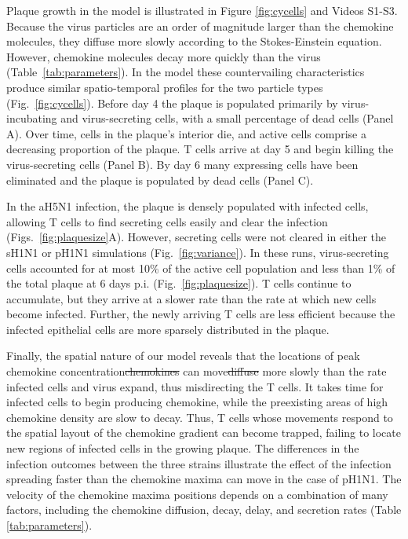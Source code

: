 \documentclass[preprint,10pt,numbers]{elsarticle}
\newcommand{\removed}[1]{{\color{dkred}\sout{#1}}}
\newcommand{\new}[1]{{\color{dkgreen}#1}}
\begin{document}
Plaque growth in the model is illustrated in Figure \ref{fig:cycells} and Videos S1-S3.  Because the virus particles are an order of magnitude larger than the chemokine molecules, they diffuse more slowly according to the Stokes-Einstein equation.  However, chemokine molecules decay more quickly than the virus (Table~\ref{tab:parameters}).  In the model these countervailing characteristics produce similar spatio-temporal profiles for the two particle types (Fig.~\ref{fig:cycells}). Before day 4 the plaque is populated primarily by virus-incubating and virus-secreting cells, with a small percentage of dead cells (Panel A). Over time, cells in the plaque's interior die, and active cells comprise a decreasing proportion of the plaque. T cells arrive at day 5 and begin killing the virus-secreting cells (Panel B). By day 6 many expressing cells have been eliminated and the plaque is populated by dead cells (Panel C).  

In the aH5N1 infection, the plaque is densely populated with infected cells, allowing T cells to find secreting cells easily and clear the infection (Figs.~\ref{fig:plaquesize}A).  However, secreting cells were not cleared in either the sH1N1 or pH1N1 simulations (Fig.~\ref{fig:variance}).  In these runs, virus-secreting cells accounted for at most 10\% of the active cell population and less than 1\% of the total plaque at 6 days p.i. (Fig.~\ref{fig:plaquesize}).  T cells continue to accumulate, but they arrive at a slower rate than the rate at which new cells become infected.  Further, the newly arriving T cells are less efficient because the infected epithelial cells are more sparsely distributed in the plaque.

Finally, the spatial nature of our model reveals that \new{the locations of peak chemokine concentration}\removed{chemokines} can \new{move}\removed{diffuse} more slowly than the rate infected cells and virus expand, thus misdirecting the T cells.  It takes time for infected cells to begin producing chemokine, while the preexisting areas of high chemokine density are slow to decay.  Thus, T cells whose movements respond to the spatial layout of the chemokine gradient can become trapped, failing to locate new regions of infected cells in the growing plaque.  The differences in the infection outcomes between the three strains illustrate the effect of the infection spreading faster than the chemokine maxima can move in the case of pH1N1.  The velocity of the chemokine maxima positions depends on a combination of many factors, including the chemokine diffusion, decay, delay, and secretion rates (Table \ref{tab:parameters}).
\end{document}
